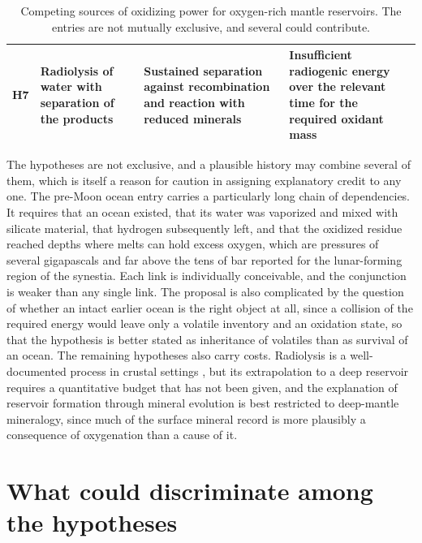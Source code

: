\documentclass[11pt]{article}
\begin{document}
\begin{table}[h]
\begin{tabularx}{\textwidth}{@{}l Y Y Y@{}}
H7 & Radiolysis of water with separation of the products \cite{lin2005} & Sustained separation against recombination and reaction with reduced minerals & Insufficient radiogenic energy over the relevant time for the required oxidant mass \\
\bottomrule
\end{tabularx}
\caption{Competing sources of oxidizing power for oxygen-rich mantle reservoirs. The entries are not mutually exclusive, and several could contribute.}
\label{tab:ledger}
\end{table}

The hypotheses are not exclusive, and a plausible history may combine several of them, which is itself a reason for caution in assigning explanatory credit to any one. The pre-Moon ocean entry carries a particularly long chain of dependencies. It requires that an ocean existed, that its water was vaporized and mixed with silicate material, that hydrogen subsequently left, and that the oxidized residue reached depths where melts can hold excess oxygen, which are pressures of several gigapascals and far above the tens of bar reported for the lunar-forming region of the synestia. Each link is individually conceivable, and the conjunction is weaker than any single link. The proposal is also complicated by the question of whether an intact earlier ocean is the right object at all, since a collision of the required energy would leave only a volatile inventory and an oxidation state, so that the hypothesis is better stated as inheritance of volatiles than as survival of an ocean. The remaining hypotheses also carry costs. Radiolysis is a well-documented process in crustal settings \cite{lin2005}, but its extrapolation to a deep reservoir requires a quantitative budget that has not been given, and the explanation of reservoir formation through mineral evolution is best restricted to deep-mantle mineralogy, since much of the surface mineral record is more plausibly a consequence of oxygenation than a cause of it.

\section{What could discriminate among the hypotheses}
\end{document}
